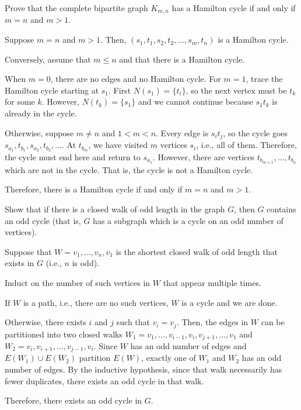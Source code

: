 \documentclass[class=math239,notes,tikz]{agony}
\begin{document}
\begin{xca}
  Prove that the complete bipartite graph $K_{m,n}$ has a Hamilton cycle
  if and only if $m = n$ and $m > 1$.
\end{xca}
\begin{prf}
  Suppose $m = n$ and $m > 1$.
  Then, $(s_1,t_1,s_2,t_2,\dotsc,s_m,t_n)$ is a Hamilton cycle.

  Conversely, assume \Wlog that $m \leq n$ and that there is a Hamilton cycle.

  When $m = 0$, there are no edges and no Hamilton cycle.
  For $m = 1$, trace the Hamilton cycle starting at $s_1$.
  First $N(s_1) = \{t_i\}$, so the next vertex must be $t_k$ for some $k$.
  However, $N(t_k) = \{s_1\}$ and we cannot continue because $s_1t_k$ is already in the cycle.

  Otherwise, suppose $m \neq n$ and $1 < m < n$.
  Every edge is $s_i t_j$, so the cycle goes $s_{a_1},t_{b_1},s_{a_2},t_{b_2},\dotsc$.
  At $t_{b_m}$, we have visited $m$ vertices $s_i$, i.e., all of them.
  Therefore, the cycle must end here and return to $s_{a_1}$.
  However, there are vertices $t_{b_{m+1}},\dotsc,t_{b_n}$ which are not in the cycle.
  That is, the cycle is not a Hamilton cycle.

  Therefore, there is a Hamilton cycle if and only if $m = n$ and $m > 1$.
\end{prf}

\begin{xca}\label{xca:oddcycle}
  Show that if there is a closed walk of odd length in the graph $G$,
  then $G$ contains an odd cycle
  (that is, $G$ has a subgraph which is a cycle on an odd number of vertices).
\end{xca}
\begin{prf}
  Suppose that $W = v_1,\dotsc,v_n,v_1$
  is the shortest closed walk of odd length that exists in $G$ (i.e., $n$ is odd).

  Induct on the number of such vertices in $W$ that appear multiple times.

  If $W$ is a path, i.e., there are no such vertices, $W$ is a cycle and we are done.

  Otherwise, there exists $i$ and $j$ such that $v_i = v_j$.
  Then, the edges in $W$ can be partitioned into two closed walks
  $W_1 = v_1,\dotsc,v_{i-1},v_i,v_{j+1},\dotsc,v_1$ and $W_2 = v_i,v_{i+1},\dotsc,v_{j-1},v_i$.
  Since $W$ has an odd number of edges and $E(W_1) \cup E(W_2)$ partition $E(W)$,
  exactly one of $W_1$ and $W_2$ has an odd number of edges.
  By the inductive hypothesis, since that walk necessarily has fewer duplicates,
  there exists an odd cycle in that walk.

  Therefore, there exists an odd cycle in $G$.
\end{prf}
\end{document}

